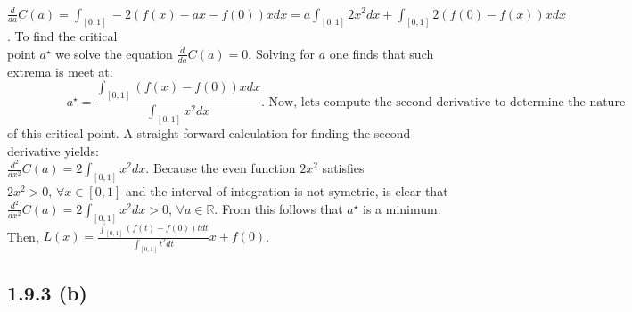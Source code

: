 \documentclass{exam}
\begin{document}
$\frac{d}{da} C(a) = \displaystyle\int_{[0,1]} -2(f(x) - ax -f(0)) x d x = a \displaystyle \int_{[0,1]} 2x^2 d x +  \displaystyle\int_{[0,1]} 2(f(0) - f(x)) x d x$.  To find the critical \\
point $a^\star$ we solve the equation $\frac{d}{da} C(a) = 0$. Solving for $a$ one finds that such extrema is meet at: 
\begin{equation*}
    \hspace{2cm}a^\star = \displaystyle\frac{\displaystyle\int_{[0,1]} (f(x) - f(0)) x d x}{\displaystyle \int_{[0,1]} x^2 d x}. \text{ Now, lets compute the second derivative to determine the nature}
\end{equation*} of this critical point. A straight-forward calculation for finding the second derivative yields: \newline
\\
$\frac{d^2}{d x^2} C(a) = 2 \displaystyle \int_{[0,1]} x^2 d x$. Because the even function $2x^2$ satisfies $2x^2 > 0 \text{, } \forall x \in [0,1]$ and the interval of integration is not symetric, is clear that $ \frac{d^2}{d x^2} C(a) = 2 \displaystyle \int_{[0,1]} x^2 d x > 0 \text{, } \forall a \in \mathbb{R}$. From this follows 
that $a^\star$ is a minimum. Then, $L(x) = \displaystyle\frac{\displaystyle\int_{[0,1]} (f(t) - f(0)) t d t}{\displaystyle \int_{[0,1]} t^2 d t}x + f(0)$.

\subsection*{1.9.3 (b)}
\end{document}
